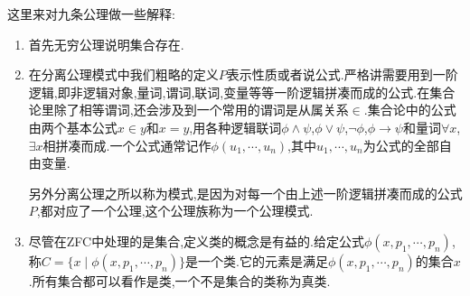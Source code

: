 这里来对九条公理做一些解释:
\begin{enumerate}
	\item 首先无穷公理说明集合存在.
	\item 在分离公理模式中我们粗略的定义$P$表示性质或者说公式.严格讲需要用到一阶逻辑,即非逻辑对象,量词,谓词,联词,变量等等一阶逻辑拼凑而成的公式.在集合论里除了相等谓词,还会涉及到一个常用的谓词是从属关系$\in$.集合论中的公式由两个基本公式$x\in y$和$x=y$,用各种逻辑联词$\phi\wedge\psi$,$\phi\vee\psi$,$\neg\phi$,$\phi\rightarrow\psi$和量词$\forall x$,$\exists x$相拼凑而成.一个公式通常记作$\phi(u_1,\cdots,u_n)$,其中$u_1,\cdots,u_n$为公式的全部自由变量.
	
	另外分离公理之所以称为模式,是因为对每一个由上述一阶逻辑拼凑而成的公式$P$,都对应了一个公理,这个公理族称为一个公理模式.
	\item 尽管在ZFC中处理的是集合,定义类的概念是有益的.给定公式$\phi(x,p_1,\cdots,p_n)$,称$C=\{x\mid \phi(x,p_1,\cdots,p_n)\}$是一个类.它的元素是满足$\phi(x,p_1,\cdots,p_n)$的集合$x$.所有集合都可以看作是类,一个不是集合的类称为真类.
	

\end{enumerate}
